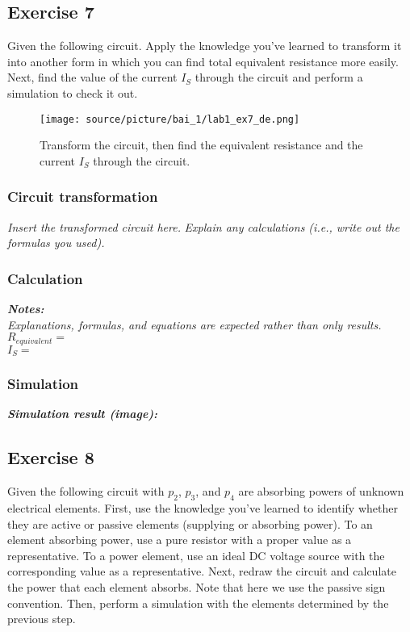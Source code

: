\subsection{Exercise 7}
Given the following circuit. Apply the knowledge you've learned to transform it into another form in which you can find total equivalent resistance more easily. Next, find the value of the current $I_S$ through the circuit and perform a simulation to check it out.

\begin{figure}[H]
    \centering
    \texttt{[image: source/picture/bai\_1/lab1\_ex7\_de.png]}
    \caption{Transform the circuit, then find the equivalent resistance and the current $I_S$ through the circuit.} 
    \label{lab1_ex7_de}
\end{figure}

\subsubsection{Circuit transformation}
\textit{Insert the transformed circuit here.}
\newpage
\textit{Explain any calculations (i.e., write out the formulas you used).}\\
\dotfill\bigskip\par\mbox{}\dotfill
\dotfill\bigskip\par\mbox{}\dotfill
\dotfill\bigskip\par\mbox{}\dotfill
\dotfill\bigskip\par\mbox{}\dotfill
\dotfill\bigskip\par\mbox{}\dotfill

\subsubsection{Calculation}
\textit{\textbf{Notes:}}\\
\textit{Explanations, formulas, and equations are expected rather than only results.}\bigskip\\
$R_{equivalent} = $\dotfill\bigskip\\
$I_S =$\dotfill\bigskip

\subsubsection{Simulation}
\textit{\textbf{Simulation result (image):}}
\newpage

\subsection{Exercise 8}
Given the following circuit with $p_2$, $p_3$, and $p_4$ are absorbing powers of unknown electrical elements. First, use the knowledge you've learned to identify whether they are active or passive elements (supplying or absorbing power). To an element absorbing power, use a pure resistor with a proper value as a representative. To a power element, use an ideal DC voltage source with the corresponding value as a representative. Next, redraw the circuit and calculate the power that each element absorbs. Note that here we use the passive sign convention. Then, perform a simulation with the elements determined by the previous step.

